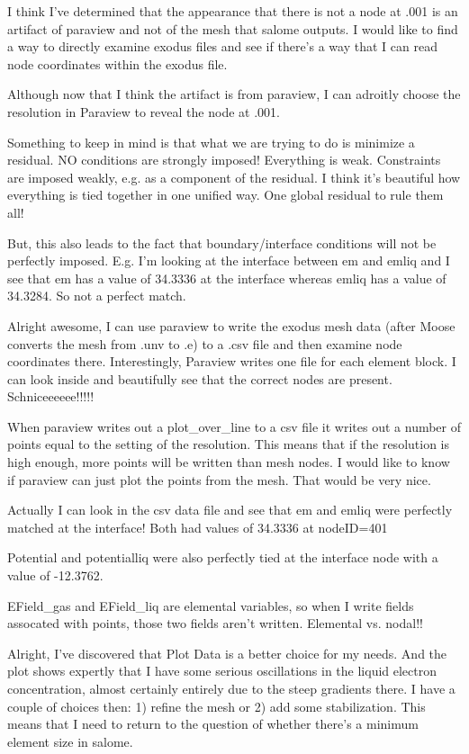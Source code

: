 {I think I've determined that the appearance that there is not a node at .001 is an artifact of paraview and not of the mesh that salome outputs. I would like to find a way to directly examine exodus files and see if there's a way that I can read node coordinates within the exodus file.

Although now that I think the artifact is from paraview, I can adroitly choose the resolution in Paraview to reveal the node at .001.

Something to keep in mind is that what we are trying to do is minimize a residual. NO conditions are strongly imposed! Everything is weak. Constraints are imposed weakly, e.g. as a component of the residual. I think it's beautiful how everything is tied together in one unified way. One global residual to rule them all!

But, this also leads to the fact that boundary/interface conditions will not be perfectly imposed. E.g. I'm looking at the interface between em and emliq and I see that em has a value of 34.3336 at the interface whereas emliq has a value of 34.3284. So not a perfect match.

Alright awesome, I can use paraview to write the exodus mesh data (after Moose converts the mesh from .unv to .e) to a .csv file and then examine node coordinates there. Interestingly, Paraview writes one file for each element block. I can look inside and beautifully see that the correct nodes are present. Schniceeeeee!!!!!

When paraview writes out a plot_over_line to a csv file it writes out a number of points equal to the setting of the resolution. This means that if the resolution is high enough, more points will be written than mesh nodes. I would like to know if paraview can just plot the points from the mesh. That would be very nice.

Actually I can look in the csv data file and see that em and emliq were perfectly matched at the interface! Both had values of 34.3336 at nodeID=401

Potential and potentialliq were also perfectly tied at the interface node with a value of -12.3762.

EField_gas and EField_liq are elemental variables, so when I write fields assocated with points, those two fields aren't written. Elemental vs. nodal!!

Alright, I've discovered that Plot Data is a better choice for my needs. And the plot shows expertly that I have some serious oscillations in the liquid electron concentration, almost certainly entirely due to the steep gradients there. I have a couple of choices then: 1) refine the mesh or 2) add some stabilization. This means that I need to return to the question of whether there's a minimum element size in salome.

}
